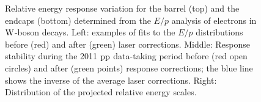 \begin{figure}
\begin{center}
\begin{tabular}{cc}
\end{tabular}
\end{center}
\caption{\label{fig:wenuEB}
Relative energy response variation for the barrel (top) and the endcaps (bottom)
determined from the $E/p$ analysis of electrons in $\mathrm{W}$-boson decays.
Left: examples of fits to the $E/p$ distributions before (red) and
after (green) laser corrections. Middle: Response stability during the
2011 $\mathrm{p}\mathrm{p}$ data-taking period before (red open circles) and after
(green points) response corrections; the blue line shows the inverse
of the average laser corrections. Right: Distribution of the projected
relative energy scales.}
\end{figure}